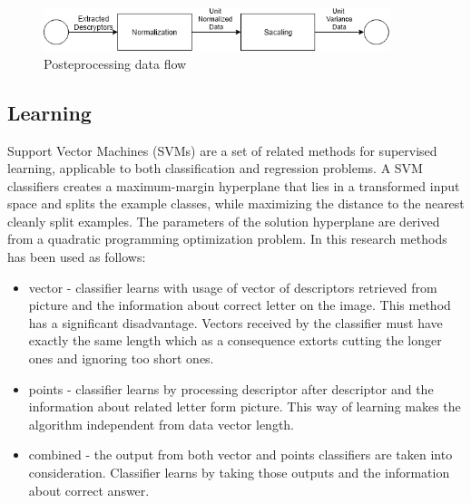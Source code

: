 \documentclass[11pt,a4paper]{article}
\begin{document}
\begin{figure}[H]
	\centering
	\includegraphics[width=0.9\textwidth]{Postprocessing.png}
	\caption{Posteprocessing data flow}
	\label{fig:Posteprocessing}
\end{figure}

\subsection{Learning}

Support Vector Machines (SVMs) are a set of related methods for supervised learning, applicable to both classification and regression problems. A SVM classifiers creates a maximum-margin hyperplane that lies in a transformed input space and splits the example classes, while maximizing the distance to the nearest cleanly split examples. The parameters of the solution hyperplane are derived from a quadratic programming optimization problem\cite{SVM1}. In this research methods has been used as follows:

\begin{itemize}
	\item vector - classifier learns with usage of vector of descriptors retrieved from picture and the information about correct letter on the image. 
This method has a significant disadvantage. Vectors received by the classifier must have exactly the same length which as a consequence extorts cutting the longer ones and ignoring too short ones.
	
	\item points - classifier learns by processing descriptor after descriptor and the information about related letter form picture. This way of learning makes the algorithm independent from data vector length.
	
	\item combined - the output from both vector and points classifiers are taken into consideration. Classifier learns by taking those outputs and the information about correct answer.
	
\end{itemize}

\end{document}

